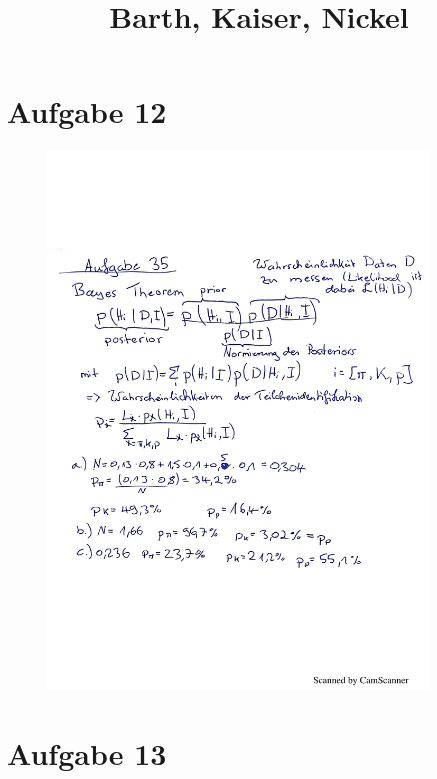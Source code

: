 

\subject{Blatt 4}
\title{Barth, Kaiser, Nickel}



\maketitle
\thispagestyle{empty}


\section{Aufgabe 12}
\begin{figure}[H]
  \centering
  \includegraphics[width=0.9\textwidth]{test.pdf}
  \caption{}
\end{figure}



\section{Aufgabe 13}

